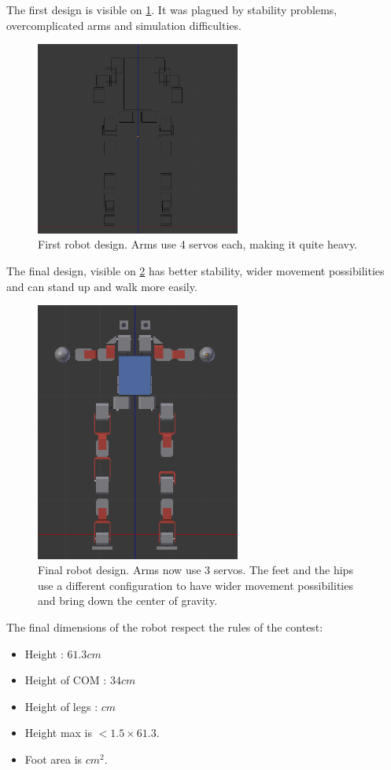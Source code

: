 The first design is visible on \cref{fig:first_robot}. It was plagued by stability problems, overcomplicated arms and simulation difficulties. 
\begin{figure}[htp]
\center
\includegraphics[width=0.6\textwidth]{figures/robot1}
\caption[Initial robot design]{First robot design. Arms use 4 servos each, making it quite heavy.}
\label{fig:first_robot}
\end{figure}

The final design, visible on \cref{fig:final_robot} has better stability, wider movement possibilities and can stand up and walk more easily. 
\begin{figure}[htp]
\center
\includegraphics[width=0.6\textwidth]{figures/robot2}
\caption[Final robot design]{Final robot design. Arms now use 3 servos. The feet and the hips use a different configuration to have wider movement possibilities and bring down the center of gravity.}
\label{fig:final_robot}
\end{figure}

The final dimensions of the robot respect the rules of the contest:
\begin{itemize}
\item Height : $61.3cm$
\item Height of COM : $34cm$
\item Height of legs : $cm$
\item Height max is $< 1.5 \times 61.3$.
\item Foot area is $ cm^2$.
\end{itemize}